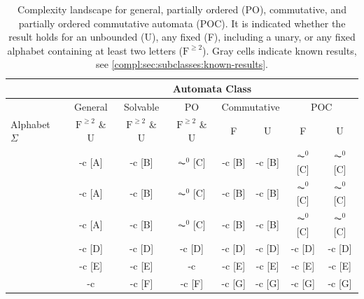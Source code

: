 \begin{table}[htb]
	\centering
	\caption[Overview complexities on classes of automata]{
	Complexity landscape for general, partially ordered (PO),
	commutative, and partially ordered commutative automata (POC).
	It is indicated whether the result holds
	for an unbounded (U), any fixed (F), including a unary,
	or any fixed alphabet containing at least two letters ($\text{F}^{\ge 2}$).
	Gray cells indicate
	known results, see \cref{compl:sec:subclasses:known-results}. %
	}

	\setlength{\tabcolsep}{5pt}
	
	\begin{tabular}{l|c|c|c|cc|cc|}
		& \multicolumn{7}{c|}{Automata Class} \\ \hline
		& General & Solvable & PO & \multicolumn{2}{c|}{Commutative}  &  \multicolumn{2}{c|}{POC} \\ \hline
		Alphabet $\Sigma$ & $\mathrm{F}^{\ge2}$ \& U
		& $\mathrm{F}^{\ge2}$ \& U
		& $\mathrm{F}^{\ge2}$ \& U
		& F & U & F & U
		\\ \hline
		
		\DFAS
		& \cg\NL-c [A]
		& \cd\LOGSPACE-c [B]
		& \cd$\AC^0$ [C]
		& \cd\LOGSPACE-c [B]
		& \cd\LOGSPACE-c [B]
		& \cd$\AC^0$ [C]
		& \cd$\AC^0$ [C]
		\\
		
		\DFASS
		& \NL-c [A]
		& \LOGSPACE-c [B]
		& $\AC^0$ [C]
		& \LOGSPACE-c [B]
		& \LOGSPACE-c [B]
		& $\AC^0$ [C]
		& $\AC^0$ [C]
		\\
		
		\DFAST
		& \cg\NL-c [A]
		& \LOGSPACE-c [B]
		& $\AC^0$ [C]
		& \LOGSPACE-c [B]
		& \LOGSPACE-c [B]
		& $\AC^0$ [C]
		& $\AC^0$ [C]
		\\
		
		\DFASW
		& \cd\LOGSPACE-c [D]
		& \cd\LOGSPACE-c [D]
		& \cd\LOGSPACE-c [D]
		& \cd\LOGSPACE-c [D]
		& \cd\LOGSPACE-c [D]
		& \cd\LOGSPACE-c [D]
		& \cd\LOGSPACE-c [D]
		\\
		
		\DFASWS
		& \cg\NP-c [E]
		& \NP-c [E]
		& \cg\NP-c %
		& \LOGSPACE-c [E]
		& \cg\NP-c [E]
		& \LOGSPACE-c [E]
		& \cg\NP-c [E]
		\\
		
		\SFS
		& \cg\PSPACE-c
		& \cd\NP-c [F]
		& \cg\NP-c [F]
		& \cd\LOGSPACE-c [G]
		& \cd\LOGSPACE-c [G]
		& \cd\LOGSPACE-c [G]
		& \cd\LOGSPACE-c [G]
		\\
		

\end{tabular}
\end{table}
